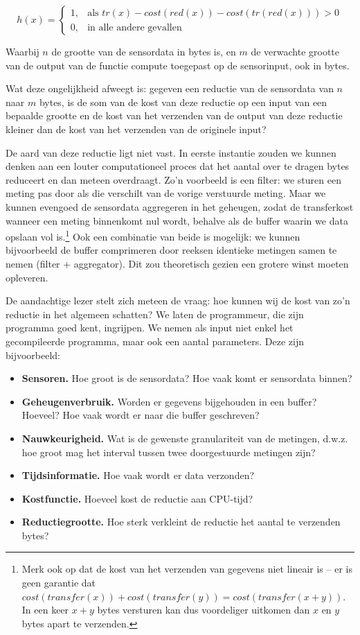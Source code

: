 \documentclass[11pt]{article}
\begin{document}
\[
h(x)= 
\begin{cases}
  1, & \text{als } tr(x) - cost(red(x)) - cost(tr(red(x))) > 0  \\
  0, & \text{in alle andere gevallen}
\end{cases}
\]

Waarbij $n$ de grootte van de sensordata in bytes is, en $m$ de verwachte
grootte van de output van de functie compute toegepast op de sensorinput, ook in
bytes.

Wat deze ongelijkheid afweegt is: gegeven een reductie van de sensordata van $n$ naar
$m$ bytes, is de som van de kost van deze reductie op een input van een bepaalde
grootte en de kost van het verzenden van de output van deze reductie kleiner dan
de kost van het verzenden van de originele input?

De aard van deze reductie ligt niet vast. In eerste instantie zouden we kunnen
denken aan een louter computationeel proces dat het aantal over te dragen bytes
reduceert en dan meteen overdraagt. Zo'n voorbeeld is een filter: we sturen een
meting pas door als die verschilt van de vorige verstuurde meting. Maar we
kunnen evengoed de sensordata aggregeren in het geheugen, zodat de transferkost
wanneer een meting binnenkomt nul wordt, behalve als de buffer waarin we data
opslaan vol is.\footnote{Merk ook op dat de kost van het verzenden van gegevens
niet lineair is -- er is geen garantie dat $cost(transfer(x)) +
cost(transfer(y)) = cost(transfer(x + y))$. In een keer $x + y$ bytes versturen
kan dus voordeliger uitkomen dan $x$ en $y$ bytes apart te verzenden.} 
Ook een combinatie van beide is mogelijk: we kunnen bijvoorbeeld de buffer
comprimeren door reeksen identieke metingen samen te nemen (filter +
aggregator). Dit zou theoretisch gezien een grotere winst moeten opleveren.

De aandachtige lezer stelt zich meteen de vraag: hoe kunnen wij de kost van zo'n
reductie in het algemeen schatten? We laten de programmeur, die zijn programma
goed kent, ingrijpen. We nemen als input niet enkel het gecompileerde programma,
maar ook een aantal parameters. Deze zijn bijvoorbeeld:

\begin{itemize}
\item \textbf{Sensoren.} Hoe groot is de sensordata? Hoe vaak komt er sensordata binnen?
\item \textbf{Geheugenverbruik.} Worden er gegevens bijgehouden in een buffer? Hoeveel? Hoe vaak wordt er naar die buffer geschreven?
\item \textbf{Nauwkeurigheid.} Wat is de gewenste granulariteit van de metingen, d.w.z. hoe groot mag het interval tussen twee doorgestuurde metingen zijn?
\item \textbf{Tijdsinformatie.} Hoe vaak wordt er data verzonden?
\item \textbf{Kostfunctie.} Hoeveel kost de reductie aan CPU-tijd?
\item \textbf{Reductiegrootte.} Hoe sterk verkleint de reductie het aantal te verzenden bytes?
\end{itemize}
\end{document}
